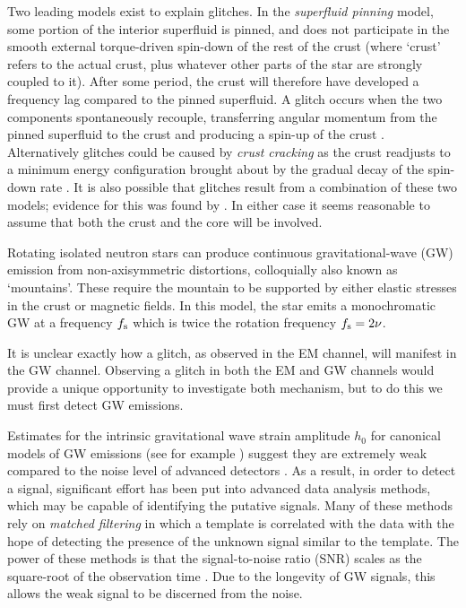 \documentclass[../full_thesis/full_thesis.tex]{subfiles}
\begin{document}
Two leading models exist to explain glitches. In the \emph{superfluid pinning}
model, some portion of the interior superfluid is pinned, and does not
participate in the smooth external torque-driven spin-down of the rest of the
crust (where `crust' refers to the actual crust, plus whatever other parts of
the star are strongly coupled to it).  After some period, the crust will
therefore have developed a frequency lag compared to the pinned superfluid. A
glitch occurs when the two components spontaneously recouple, transferring
angular momentum from the pinned superfluid to the crust and producing a
spin-up of the crust \citep{Anderson1975, Alpar1984}.  Alternatively glitches
could be caused by \emph{crust cracking} as the crust readjusts to a minimum
energy configuration brought about by the gradual decay of the spin-down rate
\citep{Baym1971}.  It is also possible that glitches result from a combination
of these two models; evidence for this was found by \citet{Melatos2008}.  In
either case it seems reasonable to assume that both the crust and the core will
be involved.

Rotating isolated neutron stars can produce continuous gravitational-wave (GW)
emission from non-axisymmetric distortions, colloquially also known as `mountains'. These
require the mountain to be supported by either elastic stresses in the crust or
magnetic fields. In this model, the star emits a monochromatic GW at a
frequency $f_{\textrm{s}}$ which is twice the rotation frequency $f_{\textrm{s}}=2\nu$.

It is unclear exactly how a glitch, as observed in the EM channel, will
manifest in the GW channel.  Observing a glitch in both the EM and GW channels
would provide a unique opportunity to investigate both mechanism, but to do
this we must first detect GW emissions.

Estimates for the intrinsic gravitational wave strain amplitude
$h_0$ for canonical models of GW emissions (see for example \citet{ligo2008})
suggest they are extremely weak compared to the noise level of advanced
detectors \citep{ligo2015}.  As a result, in order to detect a signal,
significant effort has been put into advanced data analysis methods,
which may be capable of identifying the putative signals. Many of these methods
rely on \emph{matched filtering} in which a template is correlated with the data
with the hope of detecting the presence of the unknown signal similar to the
template. The power of these methods is that
the signal-to-noise ratio (SNR) scales as the square-root of the observation
time \citep{Prix2009}. Due to the longevity of GW signals, this allows the weak
signal to be discerned from the noise.
\end{document}
